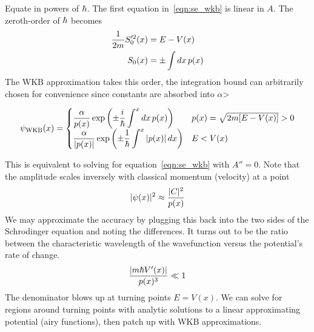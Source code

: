 Equate in powers of $\hbar$. The first equation in~\ref{eqn:se_wkb} is 
linear in $A$. The zeroth-order of $\hbar$ becomes 
\[\begin{aligned}
    \dfrac 1 {2m} S_0'^2(x) &= E - V(x) \\ 
    S_0(x) &= \pm \int dx\, p(x)
\end{aligned}\] 
The WKB approximation takes this order, the integration bound can arbitrarily chosen for 
convenience since constants are absorbed into $\alpha$> 
\begin{mdframed}
\begin{equation}
    \label{eqn:wkb_wavefunction}
    \psi_{\mathrm{WKB}}(x) = 
    \begin{cases}
        \displaystyle \dfrac {\alpha}{p(x)}\exp \left(\pm \dfrac i {\hbar} \int^x dx\,p(x)\right) & p(x)=\sqrt{2m[E-V(x)]}>0 \\ 
        \displaystyle \dfrac{\alpha}{|p(x)|} \exp\left(\pm \dfrac 1 {\hbar} \int^x |p(x)|\, dx\right) & E < V(x)
    \end{cases}
\end{equation}
\end{mdframed}
This is equivalent to solving for equation~\ref{eqn:se_wkb} with $A''=0$. 
Note that the amplitude scales inversely with classical momentum (velocity) at a point 
\[ 
    |\psi(x)|^2\approx \dfrac{|C|^2}{p(x)}
\] 
We may approximate the accuracy by plugging this back into the 
two sides of the Schrodinger equation and 
noting the differences. It turns out to be the ratio between the 
characteristic wavelength of the wavefunction 
versus the potential's rate of change. 
\[ 
    \dfrac{|m\hbar V'(x)|}{p(x)^3}\ll 1 
\] 
The denominator blows up at turning points $E = V(x)$. We can solve for 
regions around turning points with analytic solutions to a linear approximating potential 
(airy functions), then patch up with WKB approximations. 

